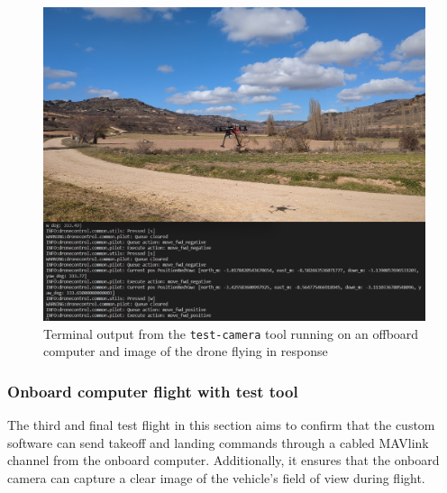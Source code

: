 \begin{figure}
  \centering
  \includegraphics[width=\textwidth, keepaspectratio]{img/video-field-test-offboard.png}
  \caption{Terminal output from the \texttt{test-camera} tool running on an offboard computer and image of the drone flying in response}
  \label{fig:flight-test-cam-offboard}
\end{figure}

\subsubsection{Onboard computer flight with test tool}
\label{subsec:fl-test-3}

The third and final test flight in this section aims to confirm that the custom software can send takeoff and landing commands through a cabled MAVlink channel from the onboard computer. Additionally, it ensures that the onboard camera can capture a clear image of the vehicle's field of view during flight.

